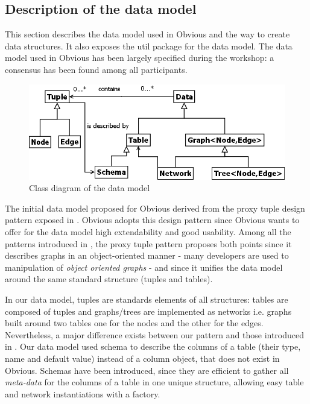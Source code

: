 \subsection{Description of the data model}

This section describes the data model used in Obvious and the way to create data structures. It also exposes the util package for the data model.  The data model used in Obvious has been largely specified during the workshop: a consensus has been found among all participants.

\begin{figure}[!ht]
\includegraphics[width=\columnwidth]{figures/obviousdataclass}
\caption{Class diagram of the data model}
\label{fig:datamodel}
\end{figure}

The initial data model proposed for Obvious derived from the proxy tuple design pattern exposed in \cite{DesignPatternsIV}. Obvious adopts this design pattern since Obvious wants to offer for the data model high extendability and good usability. Among all the patterns introduced in \cite{DesignPatternsIV}, the proxy tuple pattern proposes both points since it describes graphs in an object-oriented manner - many developers are used to manipulation of \emph{object oriented graphs} - and since it unifies the data model around the same standard structure (tuples and tables).

In our data model, tuples are standards elements of all structures: tables are composed of tuples and graphs/trees are implemented as networks i.e. graphs built around two tables one for the nodes and the other for the edges. Nevertheless, a major difference exists between our pattern and those introduced in \cite{DesignPatternsIV}. Our data model used schema to describe the columns of a table (their type, name and default value) instead of a column object, that does not exist in Obvious. Schemas have been introduced, since they are efficient to gather all \emph{meta-data} for the columns of a table in one unique structure, allowing easy table and network instantiations with a factory.

